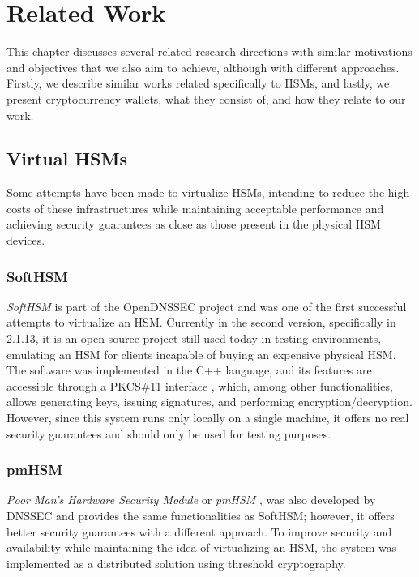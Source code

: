 
\chapter{Related Work} \label{chap:related-work}
This chapter discusses several related research directions with similar motivations and objectives that we also aim to achieve, although with different approaches. Firstly, we describe similar works related specifically to HSMs, and lastly, we present cryptocurrency wallets, what they consist of, and how they relate to our work.

\section{Virtual HSMs} \label{sec:virtual-hsms}
Some attempts have been made to virtualize HSMs, intending to reduce the high costs of these infrastructures while maintaining acceptable performance and achieving security guarantees as close as those present in the physical HSM devices.

\subsection{SoftHSM} \label{subsec:softhsm}

\textit{SoftHSM} \cite{softhsmgithub} is part of the OpenDNSSEC project \cite{softhsm} and was one of the first successful attempts to virtualize an HSM. Currently in the second version, specifically in 2.1.13, it is an open-source project still used today in testing environments, emulating an HSM for clients incapable of buying an expensive physical HSM. The software was implemented in the C++ language, and its features are accessible through a PKCS\#11 interface \cite{pkcs11spec}, which, among other functionalities, allows generating keys, issuing signatures, and performing encryption/decryption. However, since this system runs only locally on a single machine, it offers no real security guarantees and should only be used for testing purposes.


\subsection{pmHSM} \label{subsec:pmhsm}

\textit{Poor Man's Hardware Security Module} or \textit{pmHSM} \cite{pmhsm}, was also developed by DNSSEC and provides the same functionalities as SoftHSM; however, it offers better security guarantees with a different approach. To improve security and availability while maintaining the idea of virtualizing an HSM, the system was implemented as a distributed solution using threshold cryptography.

